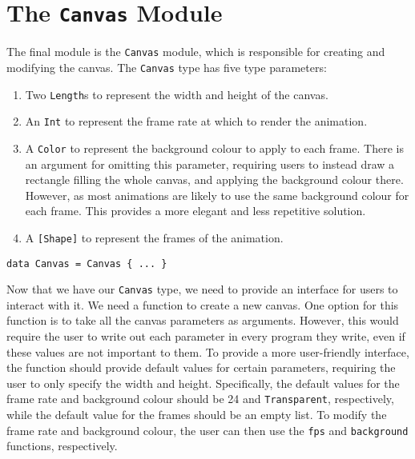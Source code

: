 \documentclass[../main.tex]{subfiles}
\begin{document}
    \section{The \texttt{Canvas}
        Module} The final module is the \texttt{Canvas} module, which is responsible
            for creating and modifying the canvas.
        The \texttt{Canvas} type has five type parameters:
        \begin{enumerate}
            \item Two \texttt{Length}s to represent the width and height of the canvas.
            \item An \texttt{Int} to represent the frame rate at which to render the animation.
            \item A \texttt{Color} to represent the background colour to apply to each frame.
                  There is an argument for omitting this parameter, requiring users to instead
                      draw a rectangle filling the whole canvas, and applying the background colour
                      there.
                  However, as most animations are likely to use the same background colour for
                      each frame.
                  This provides a more elegant and less repetitive solution.
            \item A \texttt{[Shape]} to represent the frames of the animation.
        \end{enumerate}

        \begin{lstlisting}[label={lst:canvas}, caption={The \texttt{Canvas} type definition.}]
data Canvas = Canvas { ... }\end{lstlisting}

        Now that we have our \texttt{Canvas} type, we need to provide an interface for
            users to interact with it.
        We need a function to create a new canvas.
        One option for this function is to take all the canvas parameters as arguments.
        However, this would require the user to write out each parameter in every
            program they write, even if these values are not important to them.
        To provide a more user-friendly interface, the function should provide default
            values for certain parameters, requiring the user to only specify the width and
            height.
        Specifically, the default values for the frame rate and background colour
            should be 24 and \texttt{Transparent}, respectively, while the default value
            for the frames should be an empty list.
        To modify the frame rate and background colour, the user can then use the
            \texttt{fps} and \texttt{background} functions, respectively.
\end{document}
